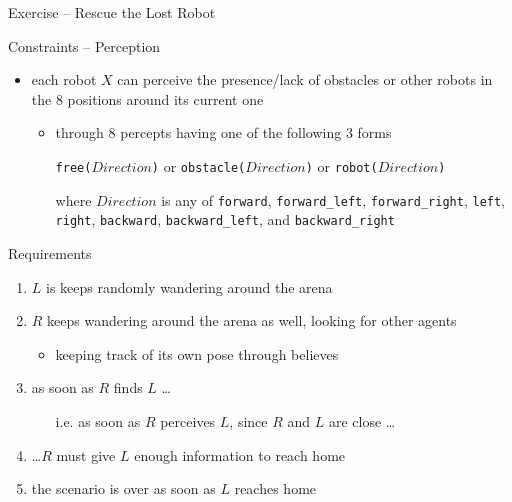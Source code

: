 \documentclass[presentation]{beamer}\mode<presentation>{\usetheme{AMSBolognaFC}}
\begin{document}
\begin{frame}[c, allowframebreaks]{Exercise \theJasonExample{} -- Rescue the Lost Robot}
\begin{exampleblock}{Constraints -- Perception}
\begin{itemize}
            \item each robot $X$ can perceive the presence/lack of \alert{obstacles} or \alert{other robots} in the 8 positions around its current one
            \begin{itemize}
                \item through 8 percepts having one of the following 3 forms
                \begin{center}
                    \texttt{free($Direction$)} or \texttt{obstacle($Direction$)} or \texttt{robot($Direction$)}
                \end{center}
                where $Direction$ is any of \texttt{forward}, \texttt{forward\_left}, \texttt{forward\_right}, \texttt{left}, \texttt{right}, \texttt{backward}, \texttt{backward\_left}, and \texttt{backward\_right}
            \end{itemize}
        \end{itemize}
    \end{exampleblock}

    \begin{alertblock}{Requirements}
        \begin{enumerate}
            \item $L$ is keeps randomly wandering around the arena
            
            \item $R$ keeps wandering around the arena as well, looking for other agents
            \begin{itemize}
                \item keeping track of its own pose through believes
            \end{itemize}
            
            \item as soon as $R$ finds $L$ \ldots
            \begin{itemize}
                \item[i.e.] as soon as $R$ perceives $L$, since $R$ and $L$ are close \ldots
            \end{itemize}
        
            \item \ldots $R$ must give $L$ enough information to reach home
            
            \item the scenario is over as soon as $L$ reaches home
        \end{enumerate}
    \end{alertblock}
    
\end{frame} 
\end{document}
